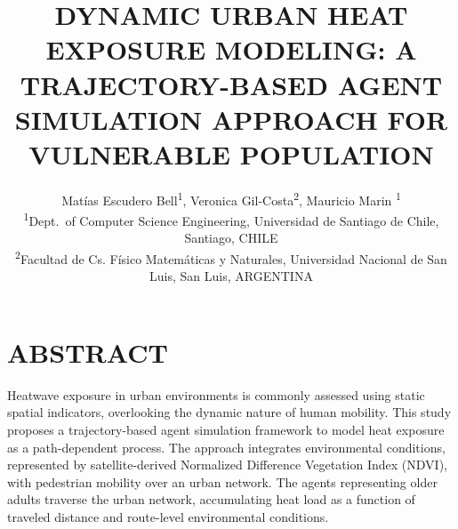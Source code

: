 \documentclass{wscpaperproc}
\theoremstyle{wsc}
\begin{document}
%
%

\title{DYNAMIC URBAN HEAT EXPOSURE MODELING: A TRAJECTORY-BASED AGENT SIMULATION APPROACH FOR  VULNERABLE POPULATION}

\author{\begin{center}
Matías Escudero Bell\textsuperscript{1}, Veronica Gil-Costa\textsuperscript{2}, Mauricio Marin \textsuperscript{1}\\
[11pt]
\textsuperscript{1}Dept.~of Computer Science Engineering, Universidad de Santiago de Chile, Santiago, CHILE\\
\textsuperscript{2}Facultad de Cs. Físico Matemáticas y Naturales, Universidad Nacional de San Luis, San Luis, ARGENTINA\\
\end{center}
}

\maketitle

\vspace{-12pt}

\section*{ABSTRACT}

Heatwave exposure in urban environments is commonly assessed using static spatial indicators, overlooking the dynamic nature of human mobility. This study proposes a trajectory-based agent simulation framework to model heat exposure as a path-dependent process. 
The approach integrates environmental conditions, represented by satellite-derived Normalized Difference Vegetation Index (NDVI), with pedestrian mobility over an urban network. The agents representing older adults traverse the urban network, accumulating heat load as a function of traveled distance and route-level environmental conditions.
\end{document}
